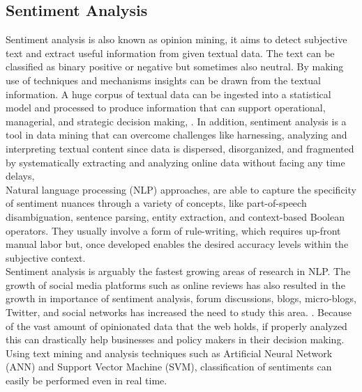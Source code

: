 \subsection{Sentiment Analysis}
Sentiment analysis is also known as opinion mining, it aims to detect subjective text and extract useful information from given textual data. The text can be classified as binary positive or negative but sometimes also neutral. 
By making use of techniques and mechanisms insights can be drawn from the textual information. A huge corpus of textual data can be ingested into a statistical model and processed to produce information that can support operational, managerial, and strategic decision making, \cite{ref6}. In addition, sentiment analysis is a tool in data mining that can overcome challenges like harnessing, analyzing and interpreting textual content since data is dispersed, disorganized, and fragmented by systematically extracting and analyzing online data without facing any time delays, \cite{ref7}
\leavevmode\\

Natural language processing (NLP) approaches, are able to capture the specificity of sentiment nuances through a variety of concepts, like part-of-speech disambiguation, sentence parsing, entity extraction, and context-based Boolean operators. They usually involve a form of rule-writing, which requires up-front manual labor but, once developed enables the desired accuracy levels within the subjective context.
\leavevmode\\

Sentiment analysis is arguably the fastest growing areas of research in NLP. The growth of social media platforms such as online reviews has also resulted in the growth in importance of sentiment analysis, forum discussions, blogs, micro-blogs, Twitter, and social networks has increased the need to study this area. \cite{ref20}. Because of the vast amount of opinionated data that the web holds, if properly analyzed this can drastically help businesses and policy makers in their decision making. Using text mining and analysis techniques such as Artificial Neural Network (ANN) and Support Vector Machine (SVM), classification of sentiments can easily be performed even in real time.
\leavevmode\\


